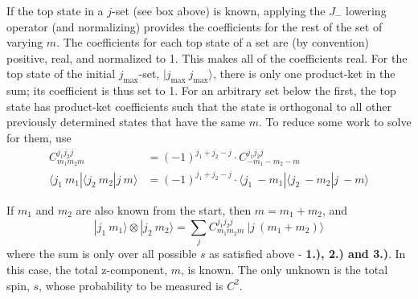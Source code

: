 \documentclass[12pt]{article}
\begin{document}
\vspace{15pt} 
    If the top state in a \(j\)-set (see box above) is known, applying the \(J_-\) lowering operator (and normalizing) %
provides the coefficients for the rest of the set of varying \(m\). %
The coefficients for each top state of a set are (by convention) positive, real, %
and normalized to 1. This makes all of the coefficients real. For the top state of the initial %
\(j_\text{max}\)-set, \( | j_\text{max}\ j_\text{max} \rangle\), %
there is only one product-ket in the sum; its coefficient %
is thus set to 1. For an arbitrary set below the first, the top state has product-ket coefficients such that the state %
is orthogonal to all other previously determined states that have the same \(m\). To reduce some work to solve for them, use %
\[ 
    \begin{aligned}
        C^{j_1 j_2 j}_{m_{1} m_{2} m} & = (-1)^{j_1 + j_2-  j} \cdot C^{j_1 j_2 j}_{-m_{1} -m_{2} -m}\\[5pt]
        \langle j_1 \ m_1 | \langle j_2\ m_2 | j\ m \rangle & 
            = (-1)^{j_1 + j_2-  j} \cdot \langle j_1 \ -m_1 | \langle j_2\ -m_2 | j\ -m\rangle 
    \end{aligned}
\]

\vspace{15pt} 
    If \(m_1\) and \(m_2\) are also known from the start, then \(m = m_1 + m_2\), and
\[ 
    \boxed{ 
        | j_1 \ m_1 \rangle \otimes | j_2 \ m_2 \rangle 
        = \sum_j C^{j_1 j_2 j}_{m_{1} m_{2} m} \ | j \ {\scriptstyle (m_1+m_2)} \rangle 
    } 
\]
where the sum is only over all possible \(s\) as satisfied above - \textbf{1.), 2.) and 3.)}.
In this case, the total z-component, \(m\), is known. The only unknown is the total spin, \(s\), 
whose probability to be measured is \(C^2\).
\end{document}
